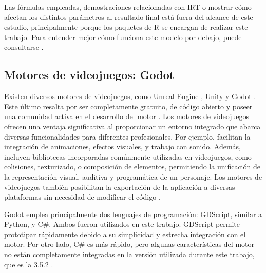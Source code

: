 Las fórmulas empleadas, demostraciones relacionadas con IRT o mostrar cómo afectan los distintos parámetros al resultado final está fuera del alcance de este estudio, principalmente porque los paquetes de R se encargan de realizar este trabajo. Para entender mejor cómo funciona este modelo por debajo, puede consultarse \cite{IRTShojima2022, CalderonStatisticalIRT}.

\subsection{Motores de videojuegos: Godot}

Existen diversos motores de videojuegos, como Unreal Engine \cite{UE}, Unity \cite{Unity} y Godot \cite{Godot}. Este último resalta por ser completamente gratuito, de código abierto y poseer una comunidad activa en el desarrollo del motor \cite{GodotGithubRepository}. Los motores de videojuegos ofrecen una ventaja significativa al proporcionar un entorno integrado que abarca diversas funcionalidades para diferentes profesionales. Por ejemplo, facilitan la integración de animaciones, efectos visuales, y trabajo con sonido. Además, incluyen bibliotecas incorporadas comúnmente utilizadas en videojuegos, como colisiones, texturizado, o composición de elementos, permitiendo la unificación de la representación visual, auditiva y programática de un personaje. Los motores de videojuegos también posibilitan la exportación de la aplicación a diversas plataformas sin necesidad de modificar el código \cite{GodotExport}.

Godot emplea principalmente dos lenguajes de programación: GDScript, similar a Python, y C\#. Ambos fueron utilizados en este trabajo. GDScript permite prototipar rápidamente debido a su simplicidad y estrecha integración con el motor. Por otro lado, C\# es más rápido, pero algunas características del motor no están completamente integradas en la versión utilizada durante este trabajo, que es la 3.5.2 \cite{GodotCSharpGDDifferences}.
